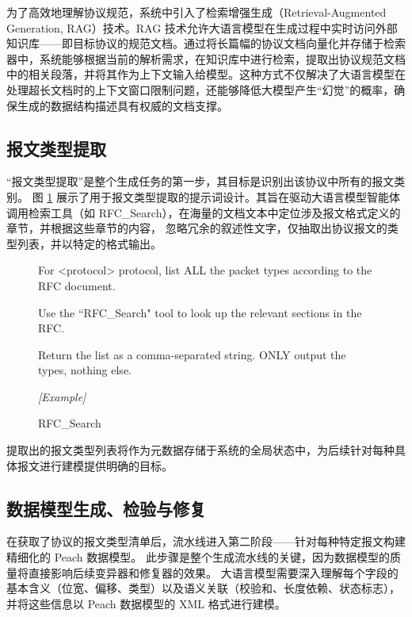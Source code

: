 为了高效地理解协议规范，系统中引入了检索增强生成\cite{lewis2020rag}（Retrieval-Augmented Generation, RAG）技术。RAG 技术允许大语言模型在生成过程中实时访问外部知识库——即目标协议的规范文档。通过将长篇幅的协议文档向量化并存储于检索器中，系统能够根据当前的解析需求，在知识库中进行检索，提取出协议规范文档中的相关段落，并将其作为上下文输入给模型。这种方式不仅解决了大语言模型在处理超长文档时的上下文窗口限制问题，还能够降低大模型产生“幻觉”的概率，确保生成的数据结构描述具有权威的文档支撑。

\subsection{报文类型提取}

``报文类型提取''是整个生成任务的第一步，其目标是识别出该协议中所有的报文类别。
图 \ref{fig:prompt_1} 展示了用于报文类型提取的提示词设计。其旨在驱动大语言模型智能体调用检索工具（如 RFC\_Search），在海量的文档文本中定位涉及报文格式定义的章节，并根据这些章节的内容，
忽略冗余的叙述性文字，仅抽取出协议报文的类型列表，并以特定的格式输出。

\begin{figure}[H]
\centering
\begin{tcolorbox}[
    before upper=\linespread{1.2}\selectfont
]
 For <protocol> protocol, list ALL the packet types according to the RFC document.

Use the ``RFC\_Search" tool to look up the relevant sections in the RFC.

Return the list as a comma-separated string.
ONLY output the types, nothing else.

\textit{[Example]}

\prule

 RFC\_Search
\end{tcolorbox}
\label{fig:prompt_1}
\end{figure}


提取出的报文类型列表将作为元数据存储于系统的全局状态中，为后续针对每种具体报文进行建模提供明确的目标。

\subsection{数据模型生成、检验与修复}

在获取了协议的报文类型清单后，流水线进入第二阶段——针对每种特定报文构建精细化的 Peach 数据模型。
此步骤是整个生成流水线的关键，因为数据模型的质量将直接影响后续变异器和修复器的效果。
大语言模型需要深入理解每个字段的基本含义（位宽、偏移、类型）以及语义关联（校验和、长度依赖、状态标志），并将这些信息以 Peach 数据模型的 XML 格式进行建模。

